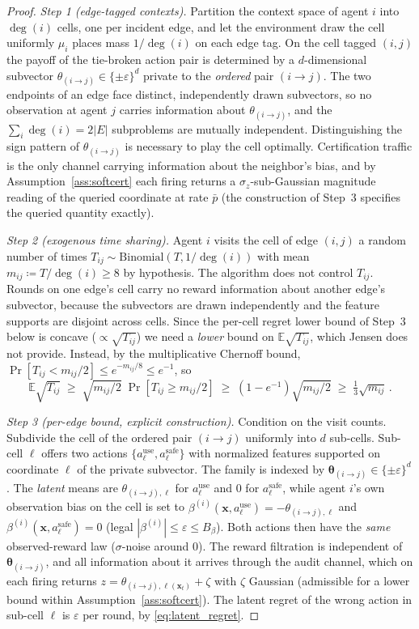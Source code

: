 \documentclass[11pt]{article}
\begin{document}
\begin{proof}
\emph{Step 1 (edge-tagged contexts).}  Partition the context space of
agent $i$ into $\deg(i)$ cells, one per incident edge, and let the
environment draw the cell uniformly $\mu_i$ places mass
$1/\deg(i)$ on each edge tag.  On the cell tagged $(i,j)$ the payoff
of the tie-broken action pair is determined by a $d$-dimensional
subvector $\theta_{(i\to j)}\in\{\pm\varepsilon\}^{d}$ private to the
\emph{ordered} pair $(i\to j)$. The two endpoints of an edge face
distinct, independently drawn subvectors, so no observation at agent
$j$ carries information about $\theta_{(i\to j)}$, and the
$\sum_i\deg(i)=2|E|$ subproblems are mutually independent.
Distinguishing the sign pattern of $\theta_{(i\to j)}$ is
necessary to play the cell optimally.  Certification traffic is the
only channel carrying information about the neighbor's bias, and by
Assumption~\ref{ass:softcert} each firing returns a
$\sigma_z$-sub-Gaussian magnitude reading of the queried coordinate at
rate $\bar p$ (the construction of Step~3 specifies the queried
quantity exactly).

\emph{Step 2 (exogenous time sharing).}  Agent $i$ visits the cell of
edge $(i,j)$ a random number of times
$T_{ij}\sim\mathrm{Binomial}(T,1/\deg(i))$ with mean
$m_{ij}\coloneqq T/\deg(i)\geq 8$ by hypothesis.  The algorithm does
not control $T_{ij}$. Rounds on
one edge's cell carry no reward information about another edge's
subvector, because the subvectors are drawn independently and the
feature supports are disjoint across cells.  Since the per-cell regret
lower bound of Step~3 below is concave ($\propto\sqrt{T_{ij}}$) we
need a \emph{lower} bound on $\mathbb E\sqrt{T_{ij}}$, which Jensen
does not provide. Instead, by the multiplicative Chernoff bound,
$\Pr[T_{ij}<m_{ij}/2]\leq e^{-m_{ij}/8}\leq e^{-1}$, so
\[
\mathbb E\sqrt{T_{ij}}
\;\geq\;\sqrt{m_{ij}/2}\;\Pr[T_{ij}\geq m_{ij}/2]
\;\geq\;(1-e^{-1})\sqrt{m_{ij}/2}
\;\geq\;\tfrac{1}{3}\sqrt{m_{ij}}\,.
\]

\emph{Step 3 (per-edge bound, explicit construction).}
Condition on the visit counts.  Subdivide the cell of the ordered pair
$(i\to j)$ uniformly into $d$ sub-cells. Sub-cell $\ell$ offers two
actions $\{a^{\mathrm{use}}_\ell,a^{\mathrm{safe}}_\ell\}$ with
normalized features supported on coordinate $\ell$ of the private
subvector.  The family is indexed by
$\bm\theta_{(i\to j)}\in\{\pm\varepsilon\}^d$. The \emph{latent} means
are $\theta_{(i\to j),\ell}$ for $a^{\mathrm{use}}_\ell$ and $0$ for
$a^{\mathrm{safe}}_\ell$, while agent $i$'s own observation bias on
the cell is set to
$\beta^{(i)}(\bm x,a^{\mathrm{use}}_\ell)=-\theta_{(i\to j),\ell}$ and
$\beta^{(i)}(\bm x,a^{\mathrm{safe}}_\ell)=0$ (legal $|\beta^{(i)}|\leq\varepsilon\leq B_\beta$).  Both actions then have
the \emph{same} observed-reward law ($\sigma$-noise around $0$). The
reward filtration is independent of $\bm\theta_{(i\to j)}$, and all
information about it arrives through the audit channel, which on each
firing returns $z=\theta_{(i\to j),\ell(\bm x_t)}+\zeta$ with $\zeta$
Gaussian (admissible for a lower bound within
Assumption~\ref{ass:softcert}).  The latent regret of the wrong action
in sub-cell $\ell$ is $\varepsilon$ per round, by
\eqref{eq:latent_regret}.


\end{proof}
\end{document}

